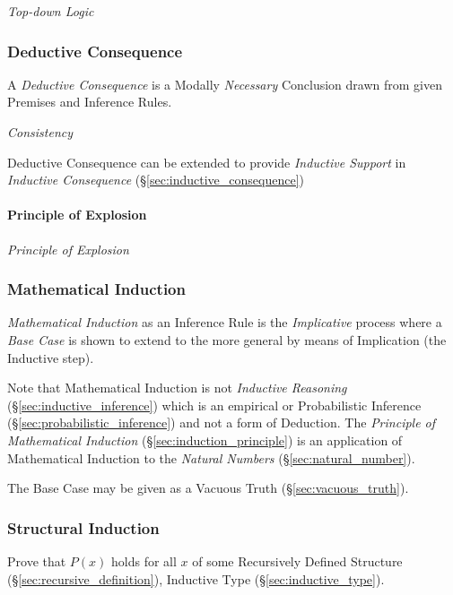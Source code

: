 \emph{Top-down Logic}

\subsubsection{Deductive Consequence}\label{sec:deductive_consequence}

A \emph{Deductive Consequence} is a Modally \emph{Necessary}
Conclusion drawn from given Premises and Inference Rules.

\emph{Consistency}

Deductive Consequence can be extended to provide \emph{Inductive
  Support} in \emph{Inductive Consequence}
(\S\ref{sec:inductive_consequence})



\paragraph{Principle of Explosion}\label{sec:explosion_principle}\hfill

\emph{Principle of Explosion}



\subsubsection{Mathematical Induction}\label{sec:mathematical_induction}

\emph{Mathematical Induction} as an Inference Rule is the
\emph{Implicative} process where a \emph{Base Case} is shown to extend
to the more general by means of Implication (the Inductive step).

Note that Mathematical Induction is not \emph{Inductive Reasoning}
(\S\ref{sec:inductive_inference}) which is an empirical or
Probabilistic Inference (\S\ref{sec:probabilistic_inference}) and not
a form of Deduction. The \emph{Principle of Mathematical Induction}
(\S\ref{sec:induction_principle}) is an application of Mathematical
Induction to the \emph{Natural Numbers} (\S\ref{sec:natural_number}).

The Base Case may be given as a Vacuous Truth
(\S\ref{sec:vacuous_truth}).



\subsubsection{Structural Induction}\label{sec:structural_induction}

Prove that $P(x)$ holds for all $x$ of some Recursively Defined
Structure (\S\ref{sec:recursive_definition}), Inductive Type
(\S\ref{sec:inductive_type}).

